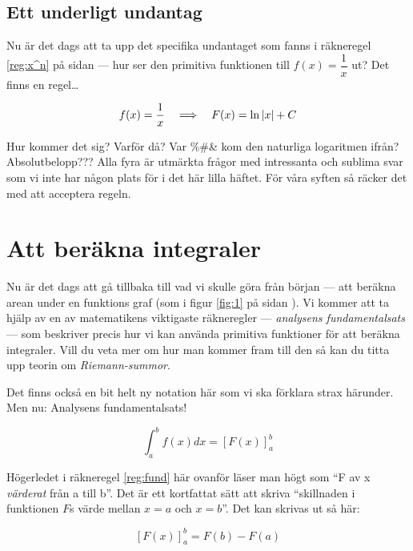 \documentclass[a4paper, 12pt]{article}
\begin{document}
\subsection{Ett underligt undantag}
Nu är det dags att ta upp det specifika undantaget som fanns i räkneregel \ref{reg:x^n} på sidan \pageref{reg:x^n} --- hur ser den primitiva funktionen till $f(x) = \dfrac{1}{x}$ ut? Det finns en regel\dots

\begin{regel}
    \label{reg:x^-1}
    \[f(x) =  \dfrac 1x \hspace{1em} \Longrightarrow \hspace{1em} F(x) = \ln\vert x \vert + C\]
\end{regel}

Hur kommer det sig? Varför då? Var \%\#\& kom den naturliga logaritmen ifrån? Absolutbelopp??? Alla fyra är utmärkta frågor med intressanta och sublima svar som vi inte har någon plats för i det här lilla häftet. För våra syften så räcker det med att acceptera regeln.

\section{Att beräkna integraler}

Nu är det dags att gå tillbaka till vad vi skulle göra från början --- att beräkna arean under en funktions graf (som i figur \ref{fig:1} på sidan \pageref{fig:1}). Vi kommer att ta hjälp av en av matematikens viktigaste räkneregler --- \emph{analysens fundamentalsats} --- som beskriver precis hur vi kan använda primitiva funktioner för att beräkna integraler. Vill du veta mer om hur man kommer fram till den så kan du titta upp teorin om \emph{Riemann-summor}.

Det finns också en bit helt ny notation här som vi ska förklara strax härunder. Men nu: Analysens fundamentalsats!
\begin{regel}
    \label{reg:fund}
    \[\int_{a}^{b}f(x)dx = \left[F(x)\right]_a^b\]
\end{regel}

Högerledet i räkneregel \ref{reg:fund} här ovanför läser man högt som ``F av x \emph{värderat} från a till b''. Det är ett kortfattat sätt att skriva ``skillnaden i funktionen $F$s värde mellan $x=a$ och $x=b$''. Det kan skrivas ut så här:


\begin{regel}
    \label{reg:val}
    \[\left[F(x)\right]_a^b = F(b) - F(a)\]
\end{regel}
\end{document}
